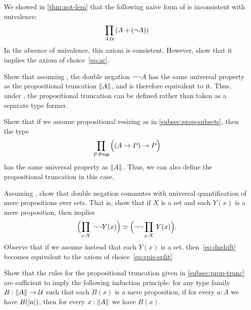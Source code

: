 \documentclass[hott-all.tex]{subfiles}
\begin{document}
\begin{ex}
  We showed in \cref{thm:not-lem} that the following naive form of \LEM{} is inconsistent with univalence:
  \[ \prd{A:\type} (A+(\neg A)) \]
  In the absence of univalence, this axiom is consistent.
  However, show that it implies the axiom of choice~\eqref{eq:ac}.
\end{ex}

\begin{ex}
  Show that assuming \LEM{}, the double negation $\neg \neg A$ has the same universal property as the propositional truncation $\mathopen{}\left\Vert A\right\Vert_{}\mathclose{}$, and is therefore equivalent to it.
  Thus, under \LEM{}, the propositional truncation can be defined rather than taken as a separate type former.
\end{ex}

\begin{ex}
  Show that if we assume propositional resizing as in \cref{subsec:prop-subsets}, then the type
  \[\prd{P:\prop} \Parens{(A\to P)\to P}\]
  has the same universal property as $\mathopen{}\left\Vert A\right\Vert_{}\mathclose{}$.
  Thus, we can also define the propositional truncation in this case.
\end{ex}

\begin{ex}
  Assuming \LEM{}, show that double negation commutes with universal quantification of mere propositions over sets.
  That is, show that if $X$ is a set and each $Y(x)$ is a mere proposition, then \LEM{} implies
  \begin{equation}
    \eqv{\Parens{\prd{x:X} \neg\neg Y(x)}}{\Parens{\neg\neg \prd{x:X} Y(x)}}.\fakelabel{eq:dnshift}
  \end{equation}
  Observe that if we assume instead that each $Y(x)$ is a set, then~\eqref{eq:dnshift} becomes equivalent to the axiom of choice~\eqref{eq:epis-split}.
\end{ex}

\begin{ex}
  Show that the rules for the propositional truncation given in \cref{subsec:prop-trunc} are sufficient to imply the following induction principle: for any type family $B:\mathopen{}\left\Vert A\right\Vert_{}\mathclose{} \to \mathcal{U}$ such that each $B(x)$ is a mere proposition, if for every $a:A$ we have $B(\mathopen{}\left|a\right|_{}^{}\mathclose{})$, then for every $x:\mathopen{}\left\Vert A\right\Vert_{}\mathclose{}$ we have $B(x)$.
\end{ex}
\end{document}
